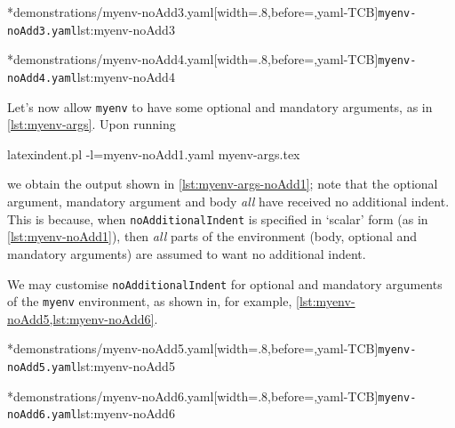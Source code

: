 	\begin{minipage}{.45\textwidth}
		\cmhlistingsfromfile[style=yaml-LST]*{demonstrations/myenv-noAdd3.yaml}[width=.8\linewidth,before=\centering,yaml-TCB]{\texttt{myenv-noAdd3.yaml}}{lst:myenv-noAdd3}
	\end{minipage}
	\hfill
	\begin{minipage}{.45\textwidth}
		\cmhlistingsfromfile[style=yaml-LST]*{demonstrations/myenv-noAdd4.yaml}[width=.8\linewidth,before=\centering,yaml-TCB]{\texttt{myenv-noAdd4.yaml}}{lst:myenv-noAdd4}
	\end{minipage}


	Let's now allow \texttt{myenv} to have some optional and mandatory arguments, as in \cref{lst:myenv-args}.
	Upon running \begin{commandshell}
latexindent.pl -l=myenv-noAdd1.yaml myenv-args.tex  
\end{commandshell} we obtain the output shown in \cref{lst:myenv-args-noAdd1}; note that the optional argument, mandatory argument and body \emph{all} have received no additional indent.
	This is because, when \texttt{noAdditionalIndent} is specified in `scalar' form (as in \cref{lst:myenv-noAdd1}), then \emph{all} parts of the environment (body, optional and mandatory arguments) are assumed to want no additional indent.

	We may customise \texttt{noAdditionalIndent} for optional and mandatory arguments of the \texttt{myenv} environment, as shown in, for example, \cref{lst:myenv-noAdd5,lst:myenv-noAdd6}.

	\begin{minipage}{.49\textwidth}
		\cmhlistingsfromfile[style=yaml-LST]*{demonstrations/myenv-noAdd5.yaml}[width=.8\linewidth,before=\centering,yaml-TCB]{\texttt{myenv-noAdd5.yaml}}{lst:myenv-noAdd5}
	\end{minipage}
	\hfill
	\begin{minipage}{.49\textwidth}
		\cmhlistingsfromfile[style=yaml-LST]*{demonstrations/myenv-noAdd6.yaml}[width=.8\linewidth,before=\centering,yaml-TCB]{\texttt{myenv-noAdd6.yaml}}{lst:myenv-noAdd6}
	\end{minipage}

